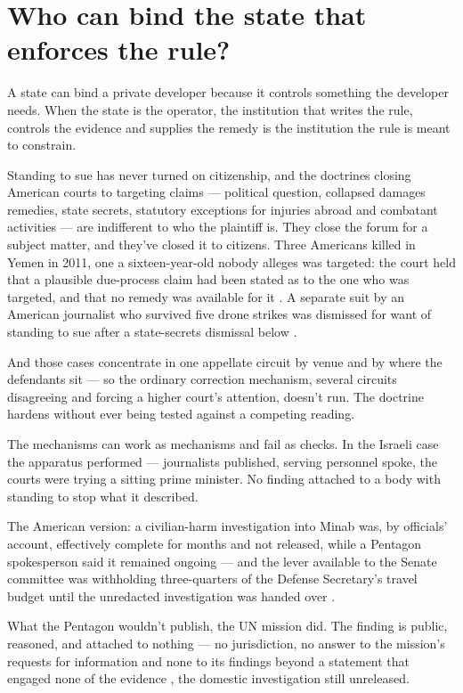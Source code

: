 \section{Who can bind the state that enforces the rule?}
\label{sec:15.7}
A state can bind a private developer because it controls something the developer needs. When the state is the operator, the institution that writes the rule, controls the evidence and supplies the remedy is the institution the rule is meant to constrain.

Standing to sue has never turned on citizenship, and the doctrines closing American courts to targeting claims — political question, collapsed damages remedies, state secrets, statutory exceptions for injuries abroad and combatant activities — are indifferent to who the plaintiff is. They close the forum for a subject matter, and they've closed it to citizens. Three Americans killed in Yemen in 2011, one a sixteen-year-old nobody alleges was targeted: the court held that a plausible due-process claim had been stated as to the one who was targeted, and that no remedy was available for it \autocite{alaulaqi2014panetta}. A separate suit by an American journalist who survived five drone strikes was dismissed for want of standing to sue after a state-secrets dismissal below \autocite{kareem2021}.

And those cases concentrate in one appellate circuit by venue and by where the defendants sit — so the ordinary correction mechanism, several circuits disagreeing and forcing a higher court's attention, doesn't run. The doctrine hardens without ever being tested against a competing reading.

The mechanisms can work as mechanisms and fail as checks. In the Israeli case the apparatus performed — journalists published, serving personnel spoke, the courts were trying a sitting prime minister. No finding attached to a body with standing to stop what it described.

The American version: a civilian-harm investigation into Minab was, by officials' account, effectively complete for months and not released, while a Pentagon spokesperson said it remained ongoing \autocite{Bloomberg2026KillChain,fpj2026minabinquiry} — and the lever available to the Senate committee was withholding three-quarters of the Defense Secretary's travel budget until the unredacted investigation was handed over \autocite{stassis2026senate}.

What the Pentagon wouldn't publish, the UN mission did. The finding is public, reasoned, and attached to nothing — no jurisdiction, no answer to the mission's requests for information \autocite[para.~97]{UNFFMIran2026} and none to its findings beyond a statement that engaged none of the evidence \autocite{rferl2026whitehouseun}, the domestic investigation still unreleased.

